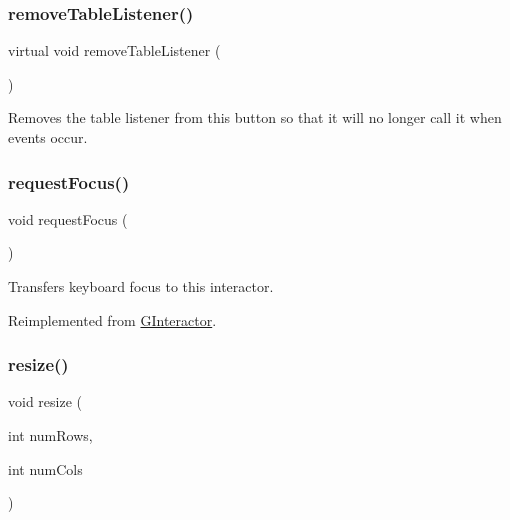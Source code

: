\mbox{\label{classGTable_aed391150e258bc6c2962f10b810681c9}} 
\subsubsection{\texorpdfstring{remove\+Table\+Listener()}{removeTableListener()}}
{\footnotesize\ttfamily virtual void remove\+Table\+Listener (\begin{DoxyParamCaption}{ }\end{DoxyParamCaption})\hspace{0.3cm}{\ttfamily [virtual]}}



Removes the table listener from this button so that it will no longer call it when events occur. 

\mbox{\label{classGTable_a49b39e0eeaf5af829e8956e9055c5cdc}} 
\subsubsection{\texorpdfstring{request\+Focus()}{requestFocus()}}
{\footnotesize\ttfamily void request\+Focus (\begin{DoxyParamCaption}{ }\end{DoxyParamCaption})\hspace{0.3cm}{\ttfamily [virtual]}}



Transfers keyboard focus to this interactor. 



Reimplemented from \mbox{\hyperlink{classGInteractor_a519fb2ac767f8b2febbb50b898b8c8cb}{G\+Interactor}}.

\mbox{\label{classGTable_a600810b1a74ec9a062ce38666a9e7602}} 
\subsubsection{\texorpdfstring{resize()}{resize()}}
{\footnotesize\ttfamily void resize (\begin{DoxyParamCaption}\item[{int}]{num\+Rows,  }\item[{int}]{num\+Cols }\end{DoxyParamCaption})\hspace{0.3cm}{\ttfamily [virtual]}}



